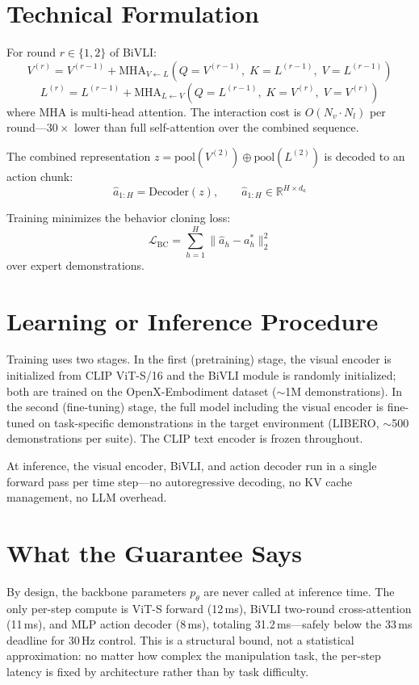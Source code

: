 \documentclass[10pt,twocolumn]{article}
\begin{document}
\section{Technical Formulation}

For round $r \in \{1, 2\}$ of BiVLI:
\[
  V^{(r)} = V^{(r-1)} + \mathrm{MHA}_{V\leftarrow L}(Q{=}V^{(r-1)},\; K{=}L^{(r-1)},\; V{=}L^{(r-1)})
\]
\[
  L^{(r)} = L^{(r-1)} + \mathrm{MHA}_{L\leftarrow V}(Q{=}L^{(r-1)},\; K{=}V^{(r)},\; V{=}V^{(r)})
\]
where $\mathrm{MHA}$ is multi-head attention. The interaction cost is
$O(N_v \cdot N_l)$ per round---$30\times$ lower than full self-attention
over the combined sequence.

The combined representation $z = \mathrm{pool}(V^{(2)}) \oplus \mathrm{pool}(L^{(2)})$
is decoded to an action chunk:
\[
  \hat{a}_{1:H} = \mathrm{Decoder}(z), \qquad
  \hat{a}_{1:H} \in \mathbb{R}^{H \times d_a}
\]

Training minimizes the behavior cloning loss:
\[
  \mathcal{L}_{\text{BC}} = \sum_{h=1}^{H} \bigl\|\hat{a}_h - a_h^*\bigr\|_2^2
\]
over expert demonstrations.

\section{Learning or Inference Procedure}

Training uses two stages. In the first (pretraining) stage, the visual
encoder is initialized from CLIP ViT-S/16 and the BiVLI module is
randomly initialized; both are trained on the OpenX-Embodiment dataset
($\sim$1M demonstrations). In the second (fine-tuning) stage, the full
model including the visual encoder is fine-tuned on task-specific
demonstrations in the target environment (LIBERO, $\sim$500
demonstrations per suite). The CLIP text encoder is frozen throughout.

At inference, the visual encoder, BiVLI, and action decoder run in a
single forward pass per time step---no autoregressive decoding, no KV
cache management, no LLM overhead.

\section{What the Guarantee Says}

By design, the backbone parameters $p_\theta$ are never called at
inference time. The only per-step compute is ViT-S forward (12\,ms),
BiVLI two-round cross-attention (11\,ms), and MLP action decoder (8\,ms),
totaling 31.2\,ms---safely below the 33\,ms deadline for 30\,Hz control.
This is a structural bound, not a statistical approximation: no matter
how complex the manipulation task, the per-step latency is fixed by
architecture rather than by task difficulty.
\end{document}

